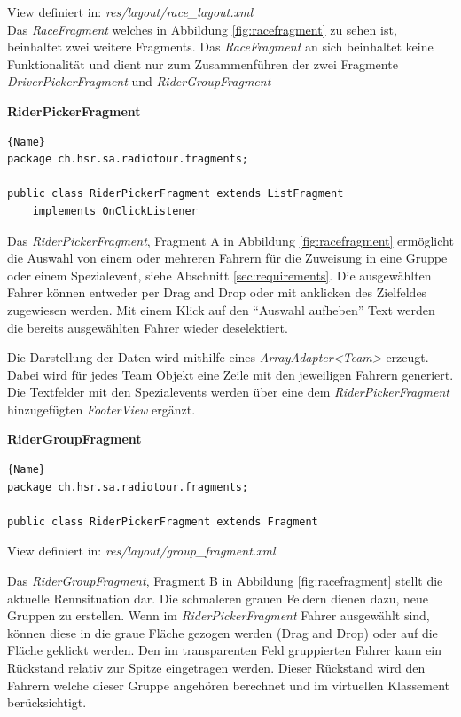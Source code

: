 View definiert in:
\textit{res/layout/race\_layout.xml}
\\
Das \textit{RaceFragment} welches in Abbildung \ref{fig:racefragment} zu sehen ist, beinhaltet zwei weitere Fragments. Das \textit{RaceFragment} an sich beinhaltet keine Funktionalität und dient nur zum Zusammenführen der zwei Fragmente \textit{DriverPickerFragment} und \textit{RiderGroupFragment}

\textbf{RiderPickerFragment}
\begin{lstlisting}{Name}
package ch.hsr.sa.radiotour.fragments;

public class RiderPickerFragment extends ListFragment
	implements OnClickListener
\end{lstlisting}

Das \textit{RiderPickerFragment}, Fragment A in Abbildung \ref{fig:racefragment} ermöglicht die Auswahl von einem oder mehreren Fahrern für die Zuweisung in eine Gruppe oder einem Spezialevent, siehe Abschnitt \ref{sec:requirements}. Die ausgewählten Fahrer können entweder per Drag and Drop oder mit anklicken des Zielfeldes zugewiesen werden. Mit einem Klick auf den "`Auswahl aufheben"' Text werden die bereits ausgewählten Fahrer wieder deselektiert.

Die Darstellung der Daten wird mithilfe eines \textit{ArrayAdapter<Team>} erzeugt. Dabei wird für jedes Team Objekt eine Zeile mit den jeweiligen Fahrern generiert. Die Textfelder mit den Spezialevents werden über eine dem \textit{RiderPickerFragment} hinzugefügten \textit{FooterView} ergänzt.

\textbf{RiderGroupFragment}
\begin{lstlisting}{Name}
package ch.hsr.sa.radiotour.fragments;

public class RiderPickerFragment extends Fragment
\end{lstlisting}


View definiert in:
\textit{res/layout/group\_fragment.xml}

Das \textit{RiderGroupFragment}, Fragment B in Abbildung \ref{fig:racefragment} stellt die aktuelle Rennsituation dar. Die schmaleren grauen Feldern dienen dazu, neue Gruppen zu erstellen. Wenn im \textit{RiderPickerFragment} Fahrer ausgewählt sind, können diese in die graue Fläche gezogen werden (Drag and Drop) oder auf die Fläche geklickt werden.
Den im transparenten Feld gruppierten Fahrer kann ein Rückstand relativ zur Spitze eingetragen werden. Dieser Rückstand wird den Fahrern welche dieser Gruppe angehören berechnet und im virtuellen Klassement berücksichtigt.
\\

